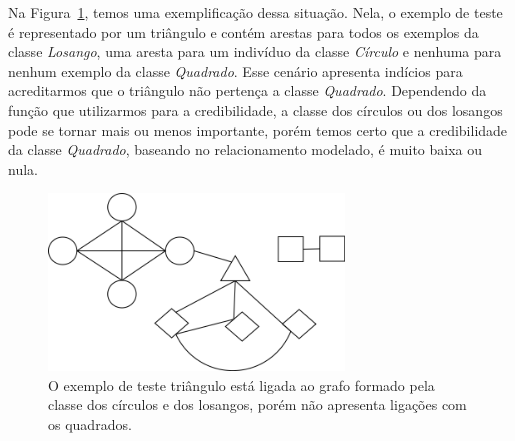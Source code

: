 
Na Figura~\ref{fig::grafo}, temos uma exemplificação dessa situação. Nela, o exemplo de teste é representado por um triângulo e contém arestas para todos os exemplos da classe \textit{Losango}, uma aresta para um indivíduo da classe \textit{Círculo} e nenhuma para nenhum exemplo da classe \textit{Quadrado}. Esse cenário apresenta indícios para acreditarmos que o triângulo não pertença a classe \textit{Quadrado}. Dependendo da função que utilizarmos para a credibilidade, a classe dos círculos ou dos losangos pode se tornar mais ou menos importante, porém temos certo que a credibilidade da classe \textit{Quadrado}, baseando no relacionamento modelado, é muito baixa ou nula.

\begin{figure}[ht!]
\centering
\includegraphics[width=0.7\textwidth]{figures/grafo.png}
\caption{O exemplo de teste triângulo está ligada ao grafo formado pela classe dos círculos e dos losangos, porém não apresenta ligações com os quadrados.}
\label{fig::grafo}
\end{figure}


